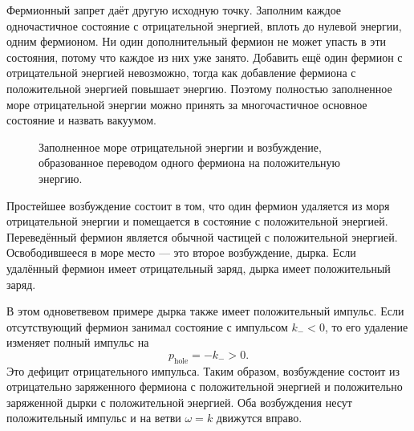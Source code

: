 Фермионный запрет даёт другую исходную точку. Заполним каждое одночастичное состояние с отрицательной энергией, вплоть до нулевой энергии, одним фермионом. Ни один дополнительный фермион не может упасть в эти состояния, потому что каждое из них уже занято. Добавить ещё один фермион с отрицательной энергией невозможно, тогда как добавление фермиона с положительной энергией повышает энергию. Поэтому полностью заполненное море отрицательной энергии можно принять за многочастичное основное состояние и назвать вакуумом.

\begin{figure}
\centering
{}
\caption{Заполненное море отрицательной энергии и возбуждение, образованное переводом одного фермиона на положительную энергию.}
\end{figure}

Простейшее возбуждение состоит в том, что один фермион удаляется из моря отрицательной энергии и помещается в состояние с положительной энергией. Переведённый фермион является обычной частицей с положительной энергией. Освободившееся в море место — это второе возбуждение, дырка. Если удалённый фермион имеет отрицательный заряд, дырка имеет положительный заряд.

В этом одноветвевом примере дырка также имеет положительный импульс. Если отсутствующий фермион занимал состояние с импульсом \(k_-<0\), то его удаление изменяет полный импульс на
\begin{equation}
p_{\mathrm{hole}}=-k_->0.
\end{equation}
Это дефицит отрицательного импульса. Таким образом, возбуждение состоит из отрицательно заряженного фермиона с положительной энергией и положительно заряженной дырки с положительной энергией. Оба возбуждения несут положительный импульс и на ветви \(\omega=k\) движутся вправо.

